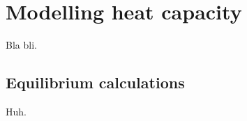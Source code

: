 \chapter{Modelling heat capacity} \label{chp:models}
    Bla bli.

    \section{Equilibrium calculations} \label{sec:}
        Huh.

    \section{}